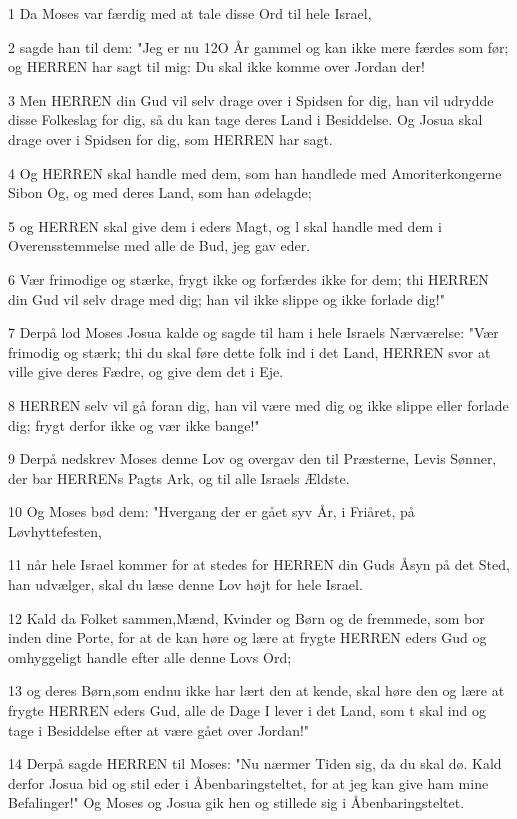 \par 1 Da Moses var færdig med at tale disse Ord til hele Israel,
\par 2 sagde han til dem: "Jeg er nu 12O År gammel og kan ikke mere færdes som før; og HERREN har sagt til mig: Du skal ikke komme over Jordan der!
\par 3 Men HERREN din Gud vil selv drage over i Spidsen for dig, han vil udrydde disse Folkeslag for dig, så du kan tage deres Land i Besiddelse. Og Josua skal drage over i Spidsen for dig, som HERREN har sagt.
\par 4 Og HERREN skal handle med dem, som han handlede med Amoriterkongerne Sibon Og, og med deres Land, som han ødelagde;
\par 5 og HERREN skal give dem i eders Magt, og l skal handle med dem i Overensstemmelse med alle de Bud, jeg gav eder.
\par 6 Vær frimodige og stærke, frygt ikke og forfærdes ikke for dem; thi HERREN din Gud vil selv drage med dig; han vil ikke slippe og ikke forlade dig!"
\par 7 Derpå lod Moses Josua kalde og sagde til ham i hele Israels Nærværelse: "Vær frimodig og stærk; thi du skal føre dette folk ind i det Land, HERREN svor at ville give deres Fædre, og give dem det i Eje.
\par 8 HERREN selv vil gå foran dig, han vil være med dig og ikke slippe eller forlade dig; frygt derfor ikke og vær ikke bange!"
\par 9 Derpå nedskrev Moses denne Lov og overgav den til Præsterne, Levis Sønner, der bar HERRENs Pagts Ark, og til alle Israels Ældste.
\par 10 Og Moses bød dem: "Hvergang der er gået syv År, i Friåret, på Løvhyttefesten,
\par 11 når hele Israel kommer for at stedes for HERREN din Guds Åsyn på det Sted, han udvælger, skal du læse denne Lov højt for hele Israel.
\par 12 Kald da Folket sammen,Mænd, Kvinder og Børn og de fremmede, som bor inden dine Porte, for at de kan høre og lære at frygte HERREN eders Gud og omhyggeligt handle efter alle denne Lovs Ord;
\par 13 og deres Børn,som endnu ikke har lært den at kende, skal høre den og lære at frygte HERREN eders Gud, alle de Dage I lever i det Land, som t skal ind og tage i Besiddelse efter at være gået over Jordan!"
\par 14 Derpå sagde HERREN til Moses: "Nu nærmer Tiden sig, da du skal dø. Kald derfor Josua bid og stil eder i Åbenbaringsteltet, for at jeg kan give ham mine Befalinger!" Og Moses og Josua gik hen og stillede sig i Åbenbaringsteltet.
